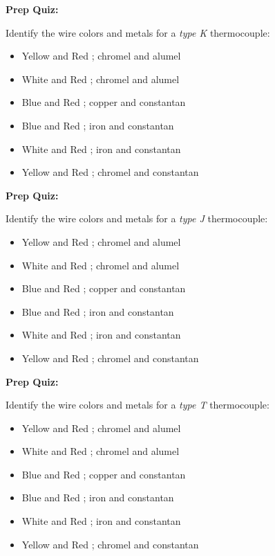 \vfil \eject

\noindent
{\bf Prep Quiz:}

Identify the wire colors and metals for a {\it type K} thermocouple:

\begin{itemize}
\item{} Yellow and Red ; chromel and alumel
\vskip 5pt 
\item{} White and Red ; chromel and alumel
\vskip 5pt 
\item{} Blue and Red ; copper and constantan
\vskip 5pt 
\item{} Blue and Red ; iron and constantan
\vskip 5pt 
\item{} White and Red ; iron and constantan
\vskip 5pt 
\item{} Yellow and Red ; chromel and constantan
\end{itemize}

\vfil \eject

\noindent
{\bf Prep Quiz:}

Identify the wire colors and metals for a {\it type J} thermocouple:

\begin{itemize}
\item{} Yellow and Red ; chromel and alumel
\vskip 5pt 
\item{} White and Red ; chromel and alumel
\vskip 5pt 
\item{} Blue and Red ; copper and constantan
\vskip 5pt 
\item{} Blue and Red ; iron and constantan
\vskip 5pt 
\item{} White and Red ; iron and constantan
\vskip 5pt 
\item{} Yellow and Red ; chromel and constantan
\end{itemize}

\vfil \eject

\noindent
{\bf Prep Quiz:}

Identify the wire colors and metals for a {\it type T} thermocouple:

\begin{itemize}
\item{} Yellow and Red ; chromel and alumel
\vskip 5pt 
\item{} White and Red ; chromel and alumel
\vskip 5pt 
\item{} Blue and Red ; copper and constantan
\vskip 5pt 
\item{} Blue and Red ; iron and constantan
\vskip 5pt 
\item{} White and Red ; iron and constantan
\vskip 5pt 
\item{} Yellow and Red ; chromel and constantan
\end{itemize}





